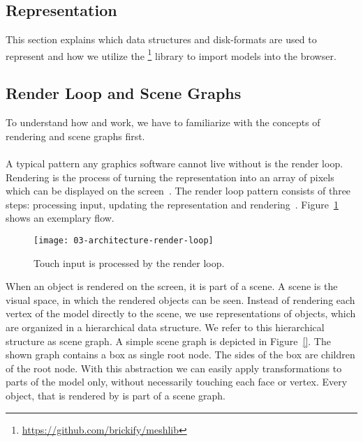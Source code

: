 \documentclass[../ClassicThesis.tex]{subfiles}
\begin{document}
\subsection{{\threedmodel} Representation}
\label{sub:model-representation}

This section explains which data structures and disk-formats are used
to represent {\threedmodels} and how we utilize the
{\meshlib}\footnote{\url{https://github.com/brickify/meshlib}}
{\javascript} library to import models into the browser.





\subsection{Render Loop and Scene Graphs}
\label{sub:render-and-graph}

To understand how {\convertify} and {\platener} work, we have to
familiarize with the concepts of rendering and scene graphs first. \\
\\
A typical pattern any graphics software cannot live without is the
render loop. Rendering is the process of turning the {\threedmodel}
representation into an array of pixels which can be displayed on the
screen~\cite[p.~2]{intro-cg}. The render loop pattern consists of
three steps: processing input, updating the {\threedmodel}
representation and rendering~\cite{gamedev-gameloop}.
Figure~\ref{fig:render-loop} shows an exemplary flow.\\

\begin{figure}[h]
  \centering
  \texttt{[image: 03-architecture-render-loop]}
  \caption{Touch input is processed by the render loop.}
  \label{fig:render-loop}
\end{figure}

When an object is rendered on the screen, it is part of a scene. A
scene is the visual space, in which the rendered objects can be seen.
Instead of rendering each vertex of the model directly to the scene,
we use representations of objects, which are organized in a
hierarchical data structure. We refer to this hierarchical structure
as scene graph. A simple scene graph is depicted in Figure~\ref{}. The
shown graph contains a box as single root node. The sides of the box
are children of the root node. With this abstraction we can easily
apply transformations to parts of the model only, without necessarily
touching each face or vertex. Every object, that is rendered by
{\convertify} is part of a scene graph.
\end{document}
